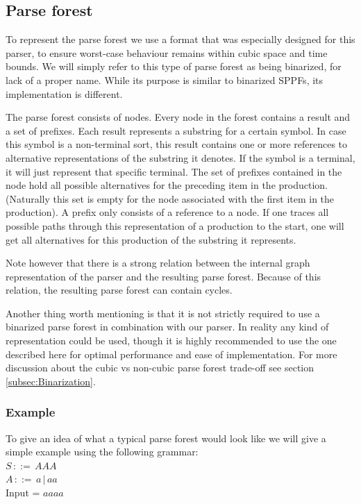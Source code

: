 \documentclass[a4paper,10pt]{article}
\begin{document}
\subsection{Parse forest}

To represent the parse forest we use a format that was especially designed for this parser, to ensure worst-case behaviour remains within cubic space and time bounds. We will simply refer to this type of parse forest as being binarized, for lack of a proper name. While its purpose is similar to binarized SPPFs\cite{scott2007brnglr}, its implementation is different.

The parse forest consists of nodes. Every node in the forest contains a result and a set of prefixes. Each result represents a substring for a certain symbol. In case this symbol is a non-terminal sort, this result contains one or more references to alternative representations of the substring it denotes. If the symbol is a terminal, it will just represent that specific terminal. The set of prefixes contained in the node hold all possible alternatives for the preceding item in the production. (Naturally this set is empty for the node associated with the first item in the production). A prefix only consists of a reference to a node. If one traces all possible paths through this representation of a production to the start, one will get all alternatives for this production of the substring it represents.

Note however that there is a strong relation between the internal graph representation of the parser and the resulting parse forest. Because of this relation, the resulting parse forest can contain cycles.

Another thing worth mentioning is that it is not strictly required to use a binarized parse forest in combination with our parser. In reality any kind of representation could be used, though it is highly recommended to use the one described here for optimal performance and ease of implementation. For more discussion about the cubic vs non-cubic parse forest trade-off see section \ref{subsec:Binarization}.

\subsubsection{Example}
To give an idea of what a typical parse forest would look like we will give a simple example using the following grammar:\\
$S\,::=\,AAA$\\
$A\,::=\,a\,|\,aa$\\
Input = $aaaa$
\end{document}
